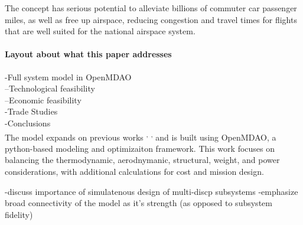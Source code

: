 	The concept has serious potential to alleviate billions of commuter car passenger miles,
	as well as free up airspace, reducing congestion and travel times
	for flights that are well suited for the national airspace system.

\paragraph{Layout about what this paper addresses}
	-Full system model in OpenMDAO\\
	--Technological feasibility\\
	--Economic feasibility\\
	-Trade Studies\\
	-Conclusions\\

	The model expands on previous works \cite{Chin} \textsuperscript{,}
	\cite{goodwin2009cantera}\textsuperscript{,} \cite{GrayBenchmarking2013}
	and is built using OpenMDAO, a python-based modeling and optimizaiton framework.
	This work focuses on balancing the thermodynamic, aerodnymanic, structural,
	weight, and power considerations, with additional calculations for cost
	and mission design.

	-discuss importance of simulatenous design of multi-discp subsystems
	-emphasize broad connectivity of the model as it's strength
	(as opposed to subsystem fidelity)


